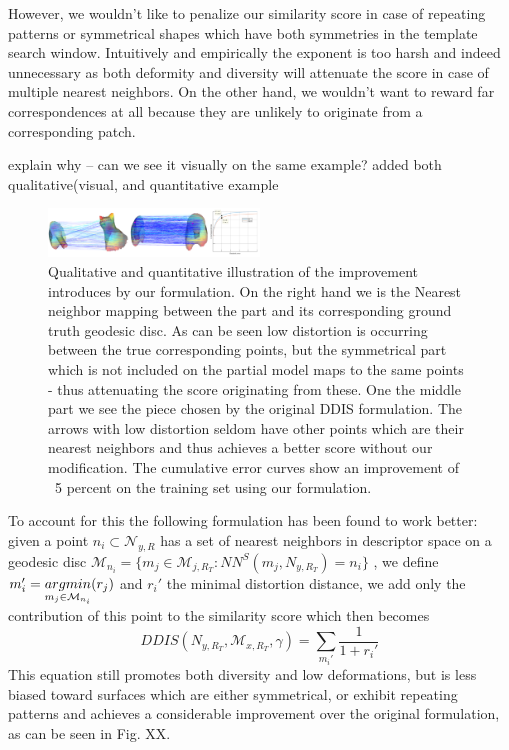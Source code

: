 \documentclass[10pt,twocolumn,letterpaper]{article}
\begin{document}
However, we wouldn't like to penalize our similarity score in case of repeating patterns or symmetrical shapes which have both symmetries in the template search window. Intuitively and empirically the exponent is too harsh and indeed unnecessary as both deformity and diversity will attenuate the score in case of multiple nearest neighbors. On the other hand, we wouldn't want to reward far correspondences at all because they are unlikely to originate from a corresponding patch. 

{\color{red} explain why -- can we see it visually on the same example?}{\color{green} added both qualitative(visual, and quantitative example}\\
\begin{figure}[htb]
	\includegraphics[width=0.5\textwidth]{figures/DDISvsWDIS.png}
	\caption{Qualitative and quantitative illustration of the improvement introduces by our formulation. On the right hand we is the Nearest neighbor mapping between the part and its corresponding ground truth geodesic disc. As can be seen low distortion is occurring between the true corresponding points, but the symmetrical part which is not included on the partial model maps to the same points - thus attenuating the score originating from these. One the middle part we see the piece chosen by the original DDIS formulation. The arrows with low distortion seldom have other points which are their nearest neighbors and thus achieves a better score without our modification. The cumulative error curves show an improvement of ~5 percent on the training set using our formulation.}
\end{figure}

To account for this the following formulation has been found to work better: given a point $n_i\subset \mathcal{N}_{y,R}$ has a set of nearest neighbors in descriptor space on a geodesic disc 
$\mathcal{M}_{n_i}=\{m_j\in\mathcal{M}_{j,R_T}:NN^S(m_j,N_{y,R_T})=n_i\}$ 
, we define 
$m_i' = \underset{m_j\in\mathcal{M}_{n_i}}{argmin}\space (r_j)$
and $r_i'$ the minimal distortion distance, we add only the contribution of this point to the similarity score which then becomes
\begin{equation}
DDIS(N_{y,R_T},\mathcal{M}_{x,R_T},\gamma)=\sum_{m_i'}\frac{1}{1+r_i'}
\end{equation}
This equation still promotes both diversity and low deformations, but is less biased toward surfaces which are either symmetrical, or exhibit repeating patterns and achieves a considerable improvement over the original formulation, as can be seen in Fig. XX.
\end{document}
